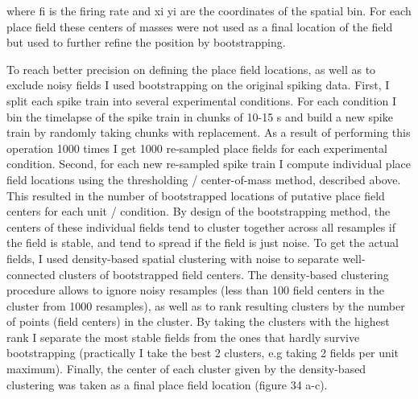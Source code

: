 where fi  is the firing rate and xi  yi  are the coordinates of the spatial bin. For each place field these centers of masses were not used as a final location of the field but used to further refine the position by bootstrapping.

To reach better precision on defining the place field locations, as well as to exclude noisy fields I used bootstrapping on the original spiking data. First, I split each spike train into several experimental conditions. For each condition I bin the timelapse of the spike train in chunks of 10-15 s and build a new spike train by randomly taking chunks with replacement. As a result of performing this operation 1000 times I get 1000 re-sampled place fields for each experimental condition. Second, for each new re-sampled spike train I compute individual place field locations using the thresholding / center-of-mass method, described above. This resulted in the number of bootstrapped locations of putative place field centers for each unit / condition. By design of the bootstrapping method, the centers of these individual fields tend to cluster together across all resamples if the field is stable, and tend to spread if the field is just noise. To get the actual fields, I used density-based spatial clustering with noise to separate well-connected clusters of bootstrapped field centers. The density-based clustering procedure allows to ignore noisy resamples (less than 100 field centers in the cluster from 1000 resamples), as well as to rank resulting clusters by the number of points (field centers) in the cluster. By taking the clusters with the highest rank I separate the most stable fields from the ones that hardly survive bootstrapping (practically I take the best 2 clusters, e.g taking 2 fields per unit maximum). Finally, the center of each cluster given by the density-based clustering was taken as a final place field location (figure 34 a-c).

